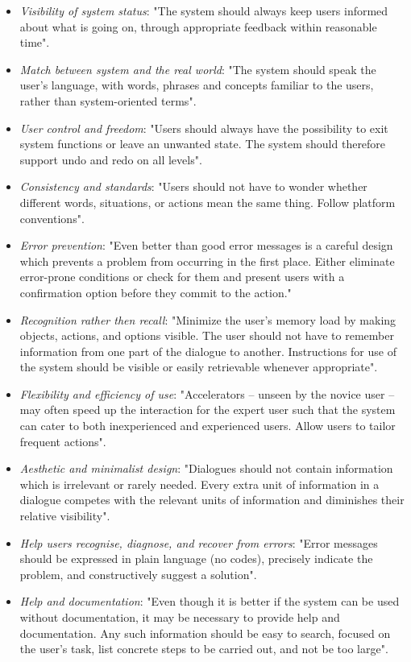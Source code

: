 \begin{itemize}
\renewcommand{\labelitemi}{$\bullet$}
\item \emph{Visibility of system status}: "The system should always keep users informed about what is going on, through appropriate feedback within reasonable time".
\item \emph{Match between system and the real world}: "The system should speak the user's language, with words, phrases and concepts familiar to the users, rather than system-oriented terms".
\item \emph{User control and freedom}: "Users should always have the possibility to exit system functions or leave an unwanted state. The system should therefore support undo and redo on all levels". 
\item \emph{Consistency and standards}: "Users should not have to wonder whether different words, situations, or actions mean the same thing. Follow platform conventions".
\item \emph{Error prevention}: "Even better than good error messages is a careful design which prevents a problem from occurring in the first place. Either eliminate error-prone conditions or check for them and present users with a confirmation option before they commit to the action."
\item \emph{Recognition rather then recall}: "Minimize the user's memory load by making objects, actions, and options visible. The user should not have to remember information from one part of the dialogue to another. Instructions for use of the system should be visible or easily retrievable whenever appropriate".
\item \emph{Flexibility and efficiency of use}: "Accelerators -- unseen by the novice user -- may often speed up the interaction for the expert user such that the system can cater to both inexperienced and experienced users. Allow users to tailor frequent actions".
\item \emph{Aesthetic and minimalist design}: "Dialogues should not contain information which is irrelevant or rarely needed. Every extra unit of information in a dialogue competes with the relevant units of information and diminishes their relative visibility".
\item \emph{Help users recognise, diagnose, and recover from errors}: "Error messages should be expressed in plain language (no codes), precisely indicate the problem, and constructively suggest a solution".
\item \emph{Help and documentation}: "Even though it is better if the system can be used without documentation, it may be necessary to provide help and documentation. Any such information should be easy to search, focused on the user's task, list concrete steps to be carried out, and not be too large".
\end{itemize}

